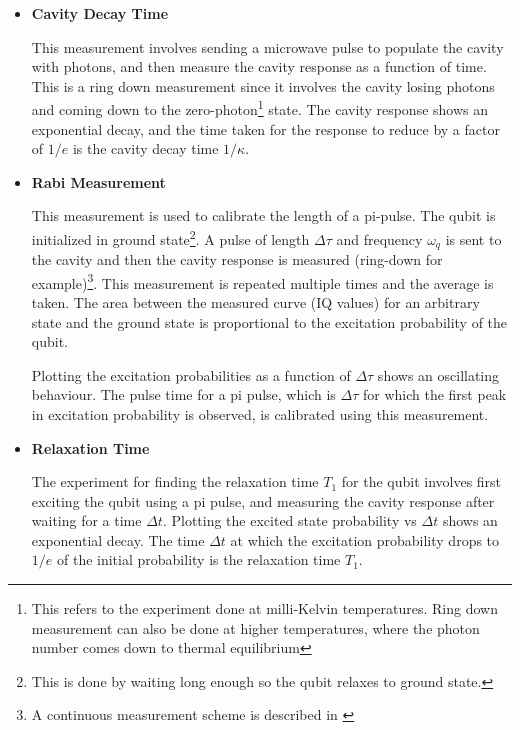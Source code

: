\begin{itemize}
\item \textbf{Cavity Decay Time}

This measurement involves sending a microwave pulse to populate the cavity with photons, and then measure the cavity response as a function of time. This is a ring down measurement since it involves the cavity losing photons and coming down to the zero-photon\footnote{This refers to the experiment done at milli-Kelvin temperatures. Ring down measurement can also be done at higher temperatures, where the photon number comes down to thermal equilibrium} state. The cavity response shows an exponential decay, and the time taken for the response to reduce by a factor of $1/e$ is the cavity decay time $1/\kappa$.

\item \textbf{Rabi Measurement}

This measurement is used to calibrate the length of a pi-pulse. The qubit is initialized in ground state\footnote{This is done by waiting long enough so the qubit relaxes to ground state.}. A pulse of length $\Delta\tau$ and frequency $\omega_q$ is sent to the cavity and then the cavity response is measured (ring-down for example)\footnote{A continuous measurement scheme is described in \cite{Bianchetti2009}}. This measurement is repeated multiple times and the average is taken. The area between the measured curve (IQ values) for an arbitrary state and the ground state is proportional to the excitation probability of the qubit.

Plotting the excitation probabilities as a function of $\Delta\tau$ shows an oscillating behaviour. The pulse time for a pi pulse, which is $\Delta\tau$ for which the first peak in excitation probability is observed, is calibrated using this measurement.

\item \textbf{Relaxation Time}

The experiment for finding the relaxation time $T_1$ for the qubit involves first exciting the qubit using a pi pulse, and measuring the cavity response after waiting for a time $\Delta t$. Plotting the excited state probability vs $\Delta t$ shows an exponential decay. The time $\Delta t$ at which the excitation probability drops to $1/e$ of the initial probability is the relaxation time $T_1$.
\end{itemize}